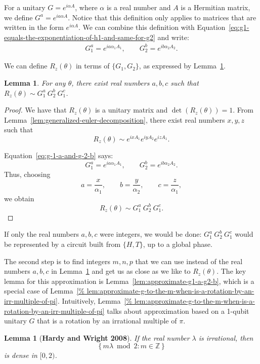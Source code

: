 \documentclass[11pt]{article}
\newtheorem{lemma}[theorem]{Lemma}
\begin{document}
For a unitary $G = e^{i\alpha A}$, where 
$\alpha$ is a real number and
$A$ is a Hermitian matrix,
we define $G^a = e^{i a\alpha A}$.
Notice that this definition only applies to matrices that are written in 
the form $e^{i \alpha A}$.
We can combine this definition with
Equation~\ref{eq:g1-equals-the-exponentiation-of-h1-and-same-for-g2} and write:
\begin{eqnarray}
G_1^a = e^{ia\alpha_1A_1},
\qquad
G_2^b = e^{ib\alpha_2A_2}.
\label{eq:g-1-a-and-g-2-b}
\end{eqnarray}

We can define $R_z(\theta)$ 
in terms of $\{G_1,G_2\}$, as expressed by Lemma~\ref{lem:from-rz-to-g1-g2}.

\begin{lemma}
\label{lem:from-rz-to-g1-g2}
For any $\theta$, there exist real numbers $a, b, c$ such that
$R_z(\theta) \sim G_1^a\ G_2^b\ G_1^c$.
\end{lemma}

\begin{proof}
We have that $R_z(\theta)$ is a unitary matrix and $\det(R_z(\theta)) = 1$. 
From Lemma~\ref{lem:generalized-euler-decomposition}, there exist real numbers
$x,y,z$ such that
\[
R_z(\theta)
\sim
e^{ixA_1}e^{iyA_2}e^{izA_1}.
\]

Equation~\ref{eq:g-1-a-and-g-2-b} says:
\[
G_1^a = e^{ia\alpha_1A_1},
\qquad
G_2^b = e^{ib\alpha_2A_2}.
\]
Thus, choosing
\[
a=\frac{x}{\alpha_1},
\qquad
b=\frac{y}{\alpha_2},
\qquad
c=\frac{z}{\alpha_1},
\]
we obtain
\[
R_z(\theta) 
\sim 
G_1^a\ G_2^b\ G_1^c.
\]
\end{proof}

If only the real numbers $a,b,c$ were integers, we would be done:
$G_1^a\ G_2^b\ G_1^c$ would be represented by a circuit built from $\{H,T\}$, 
up to a global phase.

The second step is to find integers $m,n,p$ that we can use 
instead of the real numbers $a,b,c$ in
Lemma~\ref{lem:from-rz-to-g1-g2} and 
get us as close as we like to $R_z(\theta)$.
The key lemma for this approximation is
Lemma~\ref{lem:approximate-g1-a-g2-b}, which is a special case of 
Lemma~\ref{%
lem:approximate-g-to-the-m-when-is-a-rotation-by-an-irr-multiple-of-pi}.
Intuitively, 
Lemma~\ref{%
lem:approximate-g-to-the-m-when-is-a-rotation-by-an-irr-multiple-of-pi}
talks about approximation based on a 1-qubit unitary $G$ that is a rotation by 
an irrational multiple of $\pi$.

\begin{lemma}[{\bf Hardy and Wright 2008}]
If the real number $\lambda$ is irrational, then 
\[
\{\,m\lambda \bmod 2 : m\in\mathbb Z\,\}
\]
is dense in $[0,2)$.
\label{lem:for-irrational-lambda-we-have-m-lambda-is-dense-mod-2}
\end{lemma}
\end{document}
